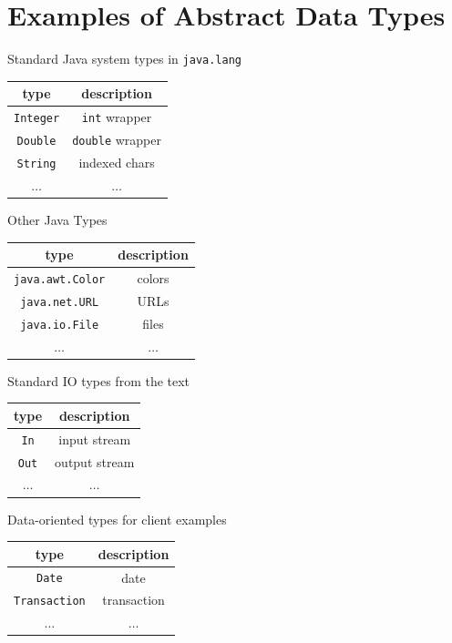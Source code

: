 \documentclass[8pt,a4paper,compress]{beamer}
\begin{document}
\section{Examples of Abstract Data Types}
\begin{frame}[fragile]
\pause

Standard Java system types in \lstinline{java.lang}
\begin{center}
\begin{tabular}{cc}
type & description \\ \hline
\lstinline$Integer$ & \lstinline$int$ wrapper \\
\lstinline$Double$ & \lstinline$double$ wrapper \\
\lstinline$String$ & indexed chars \\
$\dots$ & $\dots$
\end{tabular} 
\end{center}

\pause

Other Java Types
\begin{center}
\begin{tabular}{cc}
type & description \\ \hline
\lstinline$java.awt.Color$ & colors \\
\lstinline$java.net.URL$ & URLs \\
\lstinline$java.io.File$ & files \\
$\dots$ & $\dots$
\end{tabular} 
\end{center}

\pause

Standard IO types from the text
\begin{center}
\begin{tabular}{cc}
type & description \\ \hline
\lstinline$In$  & input stream \\
\lstinline$Out$ & output stream \\
$\dots$ & $\dots$
\end{tabular} 
\end{center}

\pause

Data-oriented types for client examples
\begin{center}
\begin{tabular}{cc}
type & description \\ \hline
\lstinline$Date$ & date \\
\lstinline$Transaction$ & transaction \\
$\dots$ & $\dots$
\end{tabular} 
\end{center}
\end{frame}
\end{document}
